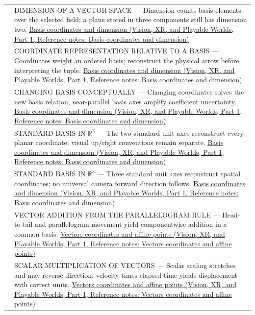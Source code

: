{\begin{longtable}[]{@{}
  >{\raggedright\arraybackslash}p{}
  >{\raggedright\arraybackslash}p{}@{}}
513 & DIMENSION OF A VECTOR SPACE --- Dimension counts basis elements over the selected field; a plane stored in three components still has dimension two. \href{../07-Vision-XR-and-Playable-Worlds-P01/main.pdf\#appendix-ce0341f7ea0d}{Basis coordinates and dimension (Vision, XR, and Playable Worlds, Part 1, Reference notes: Basis coordinates and dimension)} \\
514 & COORDINATE REPRESENTATION RELATIVE TO A BASIS --- Coordinates weight an ordered basis; reconstruct the physical arrow before interpreting the tuple. \href{../07-Vision-XR-and-Playable-Worlds-P01/main.pdf\#appendix-ce0341f7ea0d}{Basis coordinates and dimension (Vision, XR, and Playable Worlds, Part 1, Reference notes: Basis coordinates and dimension)} \\
515 & CHANGING BASIS CONCEPTUALLY --- Changing coordinates solves the new basis relation; near-parallel basis axes amplify coefficient uncertainty. \href{../07-Vision-XR-and-Playable-Worlds-P01/main.pdf\#appendix-ce0341f7ea0d}{Basis coordinates and dimension (Vision, XR, and Playable Worlds, Part 1, Reference notes: Basis coordinates and dimension)} \\
516 & STANDARD BASIS IN \(\mathbb R^2\) --- The two standard unit axes reconstruct every planar coordinate; visual up/right conventions remain separate. \href{../07-Vision-XR-and-Playable-Worlds-P01/main.pdf\#appendix-ce0341f7ea0d}{Basis coordinates and dimension (Vision, XR, and Playable Worlds, Part 1, Reference notes: Basis coordinates and dimension)} \\
517 & STANDARD BASIS IN \(\mathbb R^3\) --- Three standard unit axes reconstruct spatial coordinates; no universal camera forward direction follows. \href{../07-Vision-XR-and-Playable-Worlds-P01/main.pdf\#appendix-ce0341f7ea0d}{Basis coordinates and dimension (Vision, XR, and Playable Worlds, Part 1, Reference notes: Basis coordinates and dimension)} \\
518 & VECTOR ADDITION FROM THE PARALLELOGRAM RULE --- Head-to-tail and parallelogram movement yield componentwise addition in a common basis. \href{../07-Vision-XR-and-Playable-Worlds-P01/main.pdf\#appendix-0659864c0aa3}{Vectors coordinates and affine points (Vision, XR, and Playable Worlds, Part 1, Reference notes: Vectors coordinates and affine points)} \\
519 & SCALAR MULTIPLICATION OF VECTORS --- Scalar scaling stretches and may reverse direction; velocity times elapsed time yields displacement with correct units. \href{../07-Vision-XR-and-Playable-Worlds-P01/main.pdf\#appendix-0659864c0aa3}{Vectors coordinates and affine points (Vision, XR, and Playable Worlds, Part 1, Reference notes: Vectors coordinates and affine points)} \\

\end{longtable}}
